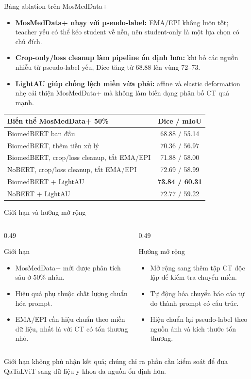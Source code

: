 \documentclass[aspectratio=169,11pt]{beamer}
\newcommand{\smallnote}[1]{%
  \par
  \vspace{0.12cm}
  {\footnotesize\color{ink}#1\par}
}
\newcommand{\twocolsummary}[4]{%
  \begin{columns}[T,totalwidth=\textwidth]
    \begin{column}{0.49\textwidth}
      \begin{block}{#1}
        #2
      \end{block}
    \end{column}
    \begin{column}{0.49\textwidth}
      \begin{block}{#3}
        #4
      \end{block}
    \end{column}
  \end{columns}
}
\begin{document}
\begin{frame}{Bảng ablation trên MosMedData+}
  \begin{itemize}
    \item \textbf{MosMedData+ nhạy với pseudo-label:} EMA/EPI không luôn tốt; teacher yếu có thể kéo student về nền, nên student-only là một lựa chọn có chủ đích.
    \item \textbf{Crop-only/loss cleanup làm pipeline ổn định hơn:} khi bỏ các nguồn nhiễu từ pseudo-label yếu, Dice tăng từ 68.88 lên vùng 72--73.
    \item \textbf{LightAU giúp chống lệch miền vừa phải:} affine và elastic deformation nhẹ cải thiện MosMedData+ mà không làm biến dạng phân bố CT quá mạnh.
  \end{itemize}
  \vspace{0.10cm}
  \begin{center}
  \scriptsize
  \renewcommand{\arraystretch}{1.14}
  \begin{tabular}{lc}
    \toprule
    \textbf{Biến thể MosMedData+ 50\%} & \textbf{Dice / mIoU} \\
    \midrule
    BiomedBERT ban đầu & 68.88 / 55.14 \\
    BiomedBERT, thêm tiền xử lý & 70.36 / 56.97 \\
    BiomedBERT, crop/loss cleanup, tắt EMA/EPI & 71.88 / 58.00 \\
    NoBERT, crop/loss cleanup, tắt EMA/EPI & 72.69 / 58.99 \\
    BiomedBERT + LightAU & \textbf{73.84 / 60.31} \\
    NoBERT + LightAU & 72.77 / 59.22 \\
    \bottomrule
  \end{tabular}
  \end{center}
\end{frame}

\begin{frame}{Giới hạn và hướng mở rộng}
  \twocolsummary
  {Giới hạn}
  {
    \begin{itemize}
      \item MosMedData+ mới được phân tích sâu ở 50\% nhãn.
      \item Hiệu quả phụ thuộc chất lượng chuẩn hóa prompt.
      \item EMA/EPI cần hiệu chuẩn theo miền dữ liệu, nhất là với CT có tổn thương nhỏ.
    \end{itemize}
  }
  {Hướng mở rộng}
  {
    \begin{itemize}
      \item Mở rộng sang thêm tập CT độc lập để kiểm tra chuyển miền.
      \item Tự động hóa chuyển báo cáo tự do thành prompt có cấu trúc.
      \item Hiệu chuẩn lại pseudo-label theo nguồn ảnh và kích thước tổn thương.
    \end{itemize}
  }
  \vspace{0.15cm}
  \smallnote{Giới hạn không phủ nhận kết quả; chúng chỉ ra phần cần kiểm soát để đưa QaTaLViT sang dữ liệu y khoa đa nguồn ổn định hơn.}
\end{frame}
\end{document}
